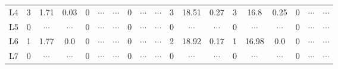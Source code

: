 \begin{table}
\begin{tabular}{ccccccccccccccccccc}
L4 & 3 & 1.71 & 0.03 & 0 & $\cdots$ & $\cdots$ & 0 & $\cdots$ & $\cdots$ & 3 & 18.51 & 0.27 & 3 & 16.8 & 0.25 & 0 & $\cdots$ & $\cdots$ \\
L5 & 0 & $\cdots$ & $\cdots$ & 0 & $\cdots$ & $\cdots$ & 0 & $\cdots$ & $\cdots$ & 0 & $\cdots$ & $\cdots$ & 0 & $\cdots$ & $\cdots$ & 0 & $\cdots$ & $\cdots$ \\
L6 & 1 & 1.77 & 0.0 & 0 & $\cdots$ & $\cdots$ & 0 & $\cdots$ & $\cdots$ & 2 & 18.92 & 0.17 & 1 & 16.98 & 0.0 & 0 & $\cdots$ & $\cdots$ \\
L7 & 0 & $\cdots$ & $\cdots$ & 0 & $\cdots$ & $\cdots$ & 0 & $\cdots$ & $\cdots$ & 0 & $\cdots$ & $\cdots$ & 0 & $\cdots$ & $\cdots$ & 0 & $\cdots$ & $\cdots$ \\
\end{tabular}
\end{table}
